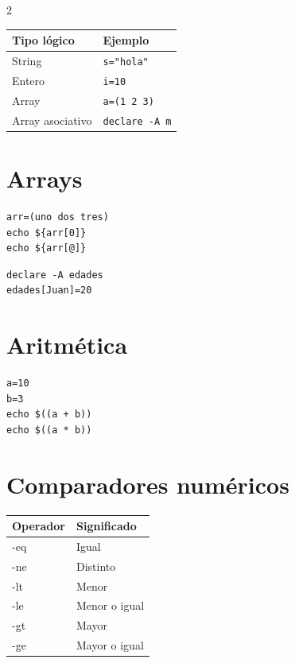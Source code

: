 \documentclass[10pt]{article}
\begin{document}
\begin{multicols}{2}
\begin{center}
\begin{tabular}{ll}
\toprule
Tipo lógico & Ejemplo \\
\midrule
String & \texttt{s="hola"} \\
Entero & \texttt{i=10} \\
Array & \texttt{a=(1 2 3)} \\
Array asociativo & \texttt{declare -A m} \\
\bottomrule
\end{tabular}
\end{center}

\section*{Arrays}

\begin{lstlisting}
arr=(uno dos tres)
echo ${arr[0]}
echo ${arr[@]}
\end{lstlisting}

\begin{lstlisting}
declare -A edades
edades[Juan]=20
\end{lstlisting}

\section*{Aritmética}

\begin{lstlisting}
a=10
b=3
echo $((a + b))
echo $((a * b))
\end{lstlisting}

\section*{Comparadores numéricos}

\begin{center}
\begin{tabular}{ll}
\toprule
Operador & Significado \\
\midrule
-eq & Igual \\
-ne & Distinto \\
-lt & Menor \\
-le & Menor o igual \\
-gt & Mayor \\
-ge & Mayor o igual \\
\bottomrule
\end{tabular}
\end{center}


\end{multicols}
\end{document}

